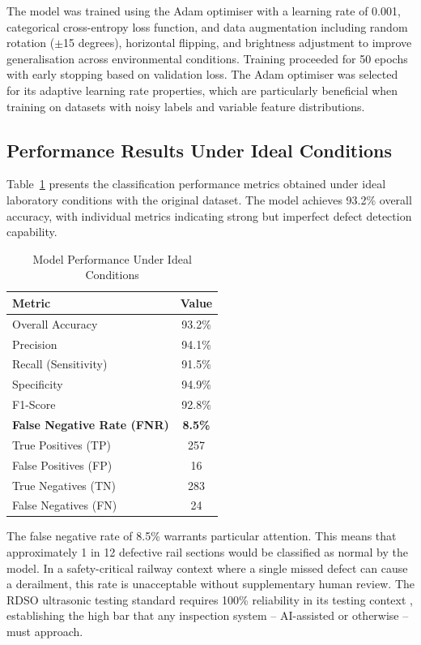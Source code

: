 \documentclass[conference]{IEEE}
\begin{document}
The model was trained using the Adam optimiser with a learning rate of 0.001, categorical cross-entropy loss function, and data augmentation including random rotation ($\pm$15 degrees), horizontal flipping, and brightness adjustment to improve generalisation across environmental conditions. Training proceeded for 50 epochs with early stopping based on validation loss. The Adam optimiser was selected for its adaptive learning rate properties, which are particularly beneficial when training on datasets with noisy labels and variable feature distributions.

\subsection{Performance Results Under Ideal Conditions}

Table~\ref{tab:results} presents the classification performance metrics obtained under ideal laboratory conditions with the original dataset. The model achieves 93.2\% overall accuracy, with individual metrics indicating strong but imperfect defect detection capability.

\begin{table}[ht]
\caption{Model Performance Under Ideal Conditions}
\label{tab:results}
\centering
\renewcommand{\arraystretch}{1.2}
\begin{tabular}{|p{4.8cm}|c|}
\hline
\textbf{Metric} & \textbf{Value} \\
\hline
Overall Accuracy & 93.2\% \\
\hline
Precision & 94.1\% \\
\hline
Recall (Sensitivity) & 91.5\% \\
\hline
Specificity & 94.9\% \\
\hline
F1-Score & 92.8\% \\
\hline
\textbf{False Negative Rate (FNR)} & \textbf{8.5\%} \\
\hline
True Positives (TP) & 257 \\
\hline
False Positives (FP) & 16 \\
\hline
True Negatives (TN) & 283 \\
\hline
False Negatives (FN) & 24 \\
\hline
\end{tabular}
\end{table}

The false negative rate of 8.5\% warrants particular attention. This means that approximately 1 in 12 defective rail sections would be classified as normal by the model. In a safety-critical railway context where a single missed defect can cause a derailment, this rate is unacceptable without supplementary human review. The RDSO ultrasonic testing standard requires 100\% reliability in its testing context \cite{rdso2020}, establishing the high bar that any inspection system -- AI-assisted or otherwise -- must approach.
\end{document}
